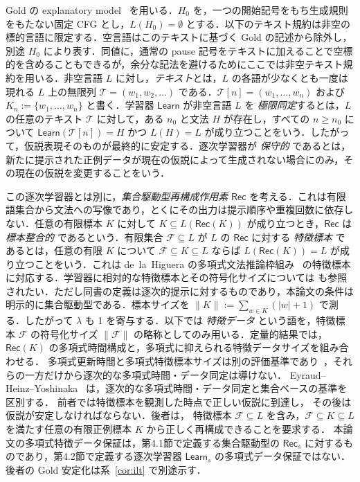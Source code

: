 \documentclass[11pt,a4paper]{ltjsarticle}
\theoremstyle{remark}
\theoremstyle{plain}
\begin{document}
Gold の explanatory model~\cite{gold1967} を用いる．$H_0$ を，一つの開始記号をもち生成規則をもたない固定 CFG とし，$L(H_0)=\emptyset$ とする．以下のテキスト規約は非空の標的言語に限定する．空言語はこのテキストに基づく Gold の記述から除外し，別途 $H_0$ により表す．同値に，通常の pause 記号をテキストに加えることで空標的を含めることもできるが，余分な記法を避けるためにここでは非空テキスト規約を用いる．非空言語 $L$ に対し，\emph{テキスト}とは，$L$ の各語が少なくとも一度は現れる $L$ 上の無限列 $\mathcal T=(w_1,w_2,\ldots)$ である．$\mathcal T[n]=(w_1,\ldots,w_n)$ および $K_n:=\{w_1,\ldots,w_n\}$ と書く．学習器 $\mathsf{Learn}$ が非空言語 $L$ を \emph{極限同定}するとは，$L$ の任意のテキスト $\mathcal T$ に対して，ある $n_0$ と文法 $H$ が存在し，すべての $n\ge n_0$ について $\mathsf{Learn}(\mathcal T[n])=H$ かつ $L(H)=L$ が成り立つことをいう．したがって，仮説表現そのものが最終的に安定する．逐次学習器が \emph{保守的} であるとは，新たに提示された正例データが現在の仮説によって生成されない場合にのみ，その現在の仮説を変更することをいう．

この逐次学習器とは別に，\emph{集合駆動型再構成作用素} $\mathsf{Rec}$ を考える．これは有限語集合から文法への写像であり，とくにその出力は提示順序や重複回数に依存しない．任意の有限標本 $K$ に対して $K\subseteq L(\mathsf{Rec}(K))$ が成り立つとき，$\mathsf{Rec}$ は \emph{標本整合的} であるという．有限集合 $\mathcal F\subseteq L$ が $L$ の $\mathsf{Rec}$ に対する \emph{特徴標本} であるとは，任意の有限 $K$ について $\mathcal F\subseteq K\subseteq L$ ならば $L(\mathsf{Rec}(K))=L$ が成り立つことをいう．これは de~la~Higuera の多項式文法推論枠組み~\cite{higuera1997} の特徴標本に対応する．学習器に相対的な特徴標本とその符号化サイズについては\cite[Section~7.3.3, Definition~7.3.3]{higuera2010} も参照されたい．ただし同書の定義は逐次的提示に対するものであり，本論文の条件は明示的に集合駆動型である．標本サイズを
$\|K\|:=\sum_{w\in K}(|w|+1)$
で測る．したがって $\lambda$ も 1 を寄与する．以下では \emph{特徴データ} という語を，特徴標本 $\mathcal F$ の符号化サイズ $\|\mathcal F\|$ の略称としてのみ用いる．定量的結果では，$\mathsf{Rec}(K)$ の多項式時間構成と，多項式に抑えられる特徴データサイズを組み合わせる．
多項式更新時間と多項式特徴標本サイズは別の評価基準であり~\cite[Sections~7.3.2--7.3.3]{higuera2010}，それらの一方だけから逐次的な多項式時間・データ同定は導けない．
Eyraud--Heinz--Yoshinaka~\cite[Definitions~2.5 and~2.8]{eyraud-heinz-yoshinaka2016}
は，逐次的な多項式時間・データ同定と集合ベースの基準を区別する．
前者では特徴標本を観測した時点で正しい仮説に到達し，
その後は仮説が安定しなければならない．後者は，
特徴標本 $\mathcal F\subseteq L$ を含み，$\mathcal F\subseteq K\subseteq L$ を満たす任意の有限正例標本 $K$ から正しく再構成できることを要求する．
本論文の多項式特徴データ保証は，第4.1節で定義する集合駆動型の
$\mathsf{Rec}_s$ に対するものであり，第4.2節で定義する逐次学習器
$\mathsf{Learn}_s$ の多項式データ保証ではない．
後者の Gold 安定化は系~\ref{cor:ilt} で別途示す．
\end{document}
